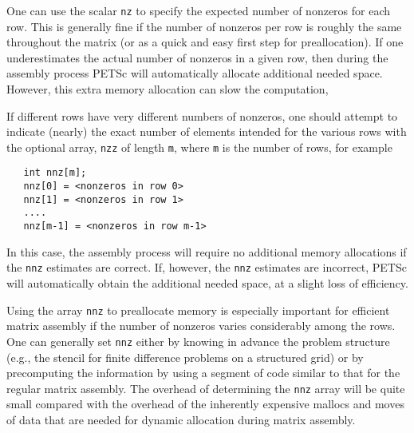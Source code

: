 One can use the scalar {\tt nz} to specify the expected
number of nonzeros for each row.  This is generally fine if the number
of nonzeros per row is roughly the same throughout the matrix (or as a
quick and easy first step for preallocation).  If one underestimates
the actual number of nonzeros in a given row, then during the assembly
process PETSc will automatically allocate additional needed space.
However, this extra memory allocation can slow the computation,

If different rows have very different numbers of nonzeros, one
should attempt to indicate (nearly) the exact number of elements
intended for the various rows with the optional array, {\tt nzz} of
length {\tt m}, where {\tt m} is the number of rows, for example
\begin{verbatim}
   int nnz[m];
   nnz[0] = <nonzeros in row 0>
   nnz[1] = <nonzeros in row 1>
   ....
   nnz[m-1] = <nonzeros in row m-1>
\end{verbatim}
In this case, the assembly process will require no additional memory
allocations if the {\tt nnz} estimates are correct. If, however,
the {\tt nnz} estimates are incorrect, PETSc will automatically
obtain the additional needed space, at a slight loss of efficiency.

Using the array {\tt nnz} to preallocate memory is especially
important for efficient matrix assembly if the number of nonzeros
varies considerably among the rows.  One can generally set {\tt nnz}
either by knowing in advance the problem structure (e.g., the stencil
for finite difference problems on a structured grid) or by
precomputing the information by using a segment of code similar to
that for the regular matrix assembly.  The overhead of determining the
{\tt nnz} array will be quite small compared with the overhead of the
inherently expensive mallocs and moves of data that are needed for
dynamic allocation during matrix assembly.

